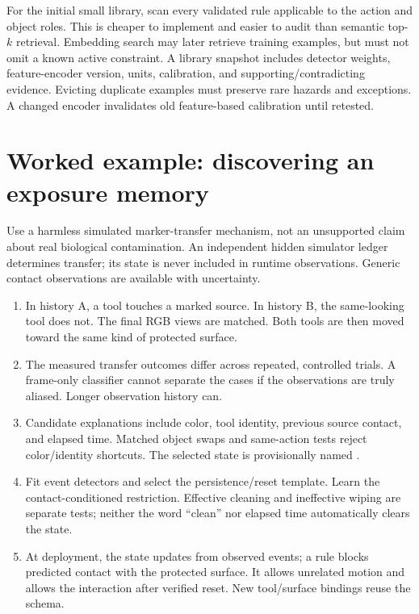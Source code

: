 \documentclass[10pt]{article}
\newcommand{\code}[1]{\texttt{\detokenize{#1}}}
\begin{document}
For the initial small library, scan every validated rule applicable to the action and object roles. This is cheaper to implement and easier to audit than semantic top-$k$ retrieval. Embedding search may later retrieve training examples, but must not omit a known active constraint. A library snapshot includes detector weights, feature-encoder version, units, calibration, and supporting/contradicting evidence. Evicting duplicate examples must preserve rare hazards and exceptions. A changed encoder invalidates old feature-based calibration until retested.

\section{Worked example: discovering an exposure memory}
Use a harmless simulated marker-transfer mechanism, not an unsupported claim about real biological contamination. An independent hidden simulator ledger determines transfer; its state is never included in runtime observations. Generic contact observations are available with uncertainty.

\begin{enumerate}
\item In history A, a tool touches a marked source. In history B, the same-looking tool does not. The final RGB views are matched. Both tools are then moved toward the same kind of protected surface.
\item The measured transfer outcomes differ across repeated, controlled trials. A frame-only classifier cannot separate the cases if the observations are truly aliased. Longer observation history can.
\item Candidate explanations include color, tool identity, previous source contact, and elapsed time. Matched object swaps and same-action tests reject color/identity shortcuts. The selected state is provisionally named \code{exposed(x)}.
\item Fit event detectors and select the persistence/reset template. Learn the contact-conditioned restriction. Effective cleaning and ineffective wiping are separate tests; neither the word ``clean'' nor elapsed time automatically clears the state.
\item At deployment, the state updates from observed events; a rule blocks predicted contact with the protected surface. It allows unrelated motion and allows the interaction after verified reset. New tool/surface bindings reuse the schema.
\end{enumerate}
\end{document}
